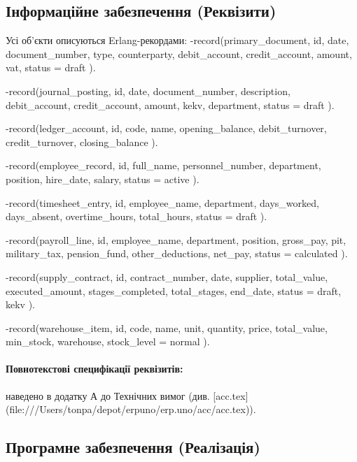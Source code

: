 \documentclass{article}
\let\originalfootnotesize\footnotesize
\let\oldverbatim\verbatim
\let\oldendverbatim\endverbatim
\renewenvironment{verbatim}{\originalfootnotesize\oldverbatim}{\oldendverbatim}
\begin{document}
\subsection{Інформаційне забезпечення (Реквізити)}
Усі об'єкти описуються Erlang-рекордами:
\begin{verbatim}
-record(primary_document, {
    id, date, document_number, type, counterparty,
    debit_account, credit_account, amount, vat, status = draft
}).

-record(journal_posting, {
    id, date, document_number, description, debit_account,
    credit_account, amount, kekv, department, status = draft
}).

-record(ledger_account, {
    id, code, name, opening_balance, debit_turnover,
    credit_turnover, closing_balance
}).

-record(employee_record, {
    id, full_name, personnel_number, department, position,
    hire_date, salary, status = active
}).

-record(timesheet_entry, {
    id, employee_name, department, days_worked, days_absent,
    overtime_hours, total_hours, status = draft
}).

-record(payroll_line, {
    id, employee_name, department, position, gross_pay,
    pit, military_tax, pension_fund, other_deductions,
    net_pay, status = calculated
}).

-record(supply_contract, {
    id, contract_number, date, supplier, total_value,
    executed_amount, stages_completed, total_stages,
    end_date, status = draft, kekv
}).

-record(warehouse_item, {
    id, code, name, unit, quantity, price, total_value,
    min_stock, warehouse, stock_level = normal
}).
\end{verbatim}

\paragraph{Повнотекстові специфікації реквізитів:} наведено в додатку А до Технічних вимог (див. [acc.tex](file:///Users/tonpa/depot/erpuno/erp.uno/acc/acc.tex)).

\subsection{Програмне забезпечення (Реалізація)}
\end{document}
